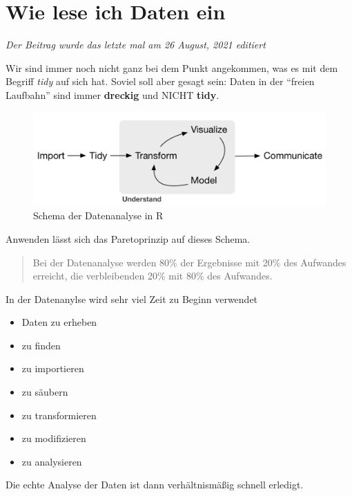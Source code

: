 \documentclass[
]{article}
\providecommand{\tightlist}{%
  \setlength{\itemsep}{0pt}\setlength{\parskip}{0pt}}
\begin{document}
\hypertarget{wie-lese-ich-daten-ein}{%
\section{Wie lese ich Daten ein}\label{wie-lese-ich-daten-ein}}

\emph{Der Beitrag wurde das letzte mal am 26 August, 2021 editiert}

Wir sind immer noch nicht ganz bei dem Punkt angekommen, was es mit dem Begriff \emph{tidy} auf sich hat. Soviel soll aber gesagt sein: Daten in der ``freien Laufbahn'' sind immer \textbf{dreckig} und NICHT \textbf{tidy}.

\begin{figure}

{\centering \includegraphics[width=1\linewidth]{images/001} 

}

\caption{Schema der Datenanalyse in R}\label{fig:unnamed-chunk-105}
\end{figure}

Anwenden lässt sich das Paretoprinzip auf dieses Schema.

\begin{quote}
Bei der Datenanalyse werden 80\% der Ergebnisse mit 20\% des Aufwandes erreicht, die verbleibenden 20\% mit 80\% des Aufwandes.
\end{quote}

In der Datenanylse wird sehr viel Zeit zu Beginn verwendet

\begin{itemize}
\tightlist
\item
  Daten zu erheben
\item
  zu finden
\item
  zu importieren
\item
  zu säubern
\item
  zu transformieren
\item
  zu modifizieren
\item
  zu analysieren
\end{itemize}

Die echte Analyse der Daten ist dann verhältnismäßig schnell erledigt.
\end{document}
